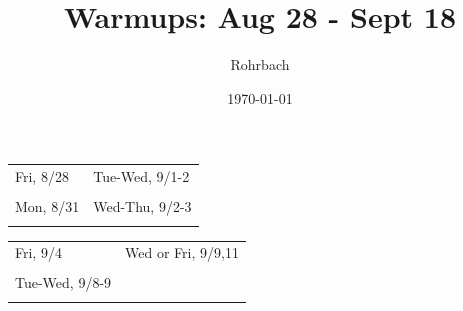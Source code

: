 \documentclass[10pt]{exam}
\title{Warmups: Aug 28 - Sept 18}
\author{Rohrbach}
\date{\today}
\begin{document}
\maketitle

\vfill

\noindent
\begin{tabularx}{\textwidth}{X|X}
  \sc Fri, 8/28 & \sc Tue-Wed, 9/1-2 \\
  &\\[3.8in] \hline
  \sc Mon, 8/31 & \sc Wed-Thu, 9/2-3 \\
  &\\[3.8in] 
\end{tabularx}

\pagebreak

\noindent
\begin{tabularx}{\textwidth}{X|X}
  \sc Fri, 9/4 & \sc Wed or Fri, 9/9,11 \\
  &\\[3.8in] \hline
  \sc Tue-Wed, 9/8-9 & \sc  \\
  &\\[3.8in] 
\end{tabularx}
\end{document}

